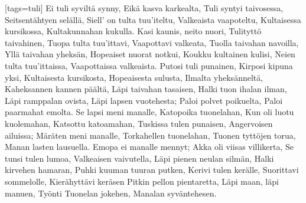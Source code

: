 [tags={tuli}]
  \beginverse
    Ei tuli syviltä synny,
    Eikä kasva karkealta,
    Tuli syntyi taivosessa,
    Seitsentähtyen selällä,
    Siell' on tulta tuu'iteltu,
    Valkeaista vaapoteltu,
    Kultaisessa kursikossa,
    Kultakunnahan kukulla.
  \endverse
  \beginverse
    Kasi kaunis, neito nuori,
    Tulityttö taivahinen,
    Tuopa tulta tuu'ittavi,
    Vaapottavi valkeata,
    Tuolla taivahan navoilla,
    Yllä taivahan yheksän,
    Hopeaiset nuorat notkui,
    Koukku kultainen kulisi,
    Neien tulta tuu'ittaissa,
    Vaapottaissa valkeaista.
  \endverse
  \beginverse
    Putosi tuli punainen,
    Kirposi kipuna yksi,
    Kultaisesta kursikosta,
    Hopeaisesta sulusta,
    Ilmalta yheksänneltä,
    Kaheksannen kannen päältä,
    Läpi taivahan tasaisen,
    Halki tuon ihalan ilman,
    Läpi ramppalan ovista,
    Läpi lapsen vuotehesta;
    Paloi polvet poikuelta,
    Paloi paarmahat emolta.
  \endverse
  \beginverse
    Se lapsi meni manalle,
    Katopoika tuonelahan,
    Kun oli luotu kuolemahan,
    Katsottu katoamahan,
    Tuskissa tulen punaisen,
    Angervoisen ailuissa;
    Märäten meni manalle,
    Torkahellen tuonelahan,
    Tuonen tyttöjen torua,
    Manan lasten lausuella.
  \endverse
  \beginverse
    Emopa ei manalle mennyt;
    Akka oli viisas villikerta,
    Se tunsi tulen lumoa,
    Valkeaisen vaivutella,
    Läpi pienen neulan silmän,
    Halki kirvehen hamaran,
    Puhki kuuman tuuran putken,
    Kerivi tulen kerälle,
    Suorittavi sommelolle,
    Kierähyttävi keräsen
    Pitkin pellon pientaretta,
    Läpi maan, läpi manuen,
    Työnti Tuonelan jokehen,
    Manalan syväntehesen.
  \endverse
\endsong

